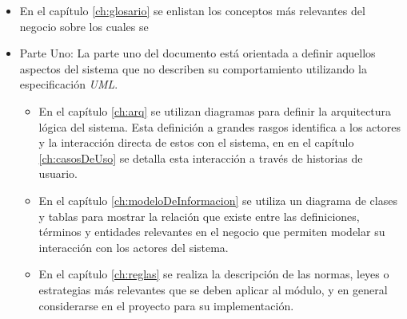 \begin{itemize}
	\item En el capítulo \ref{ch:glosario} se enlistan los conceptos más relevantes del negocio sobre los cuales se

	\item Parte Uno: 
		La parte uno del documento está orientada a definir aquellos aspectos del sistema que no describen su comportamiento utilizando la especificación \textit{UML}.
		\begin{itemize}
			\item En el capítulo \ref{ch:arq} se utilizan diagramas para definir la arquitectura lógica del sistema. Esta definición a grandes rasgos identifica a los actores y la interacción directa de estos con el sistema, en en el capítulo \ref{ch:casosDeUso} se detalla esta interacción a través de historias de usuario.
		
			\item En el capítulo \ref{ch:modeloDeInformacion} se utiliza un diagrama de clases y tablas para mostrar la relación que existe entre las definiciones, términos y entidades relevantes en el negocio que permiten modelar su interacción con los actores del sistema. 		
				
			\item En el capítulo \ref{ch:reglas} se realiza la descripción de las normas, leyes o estrategias más relevantes que se deben aplicar al módulo, y en general considerarse en el proyecto para su implementación. 
			

\end{itemize}
\end{itemize}

